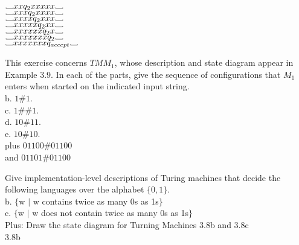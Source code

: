 \documentclass[12pt]{article}
\newcommand\Vtextvisiblespace[1][.8em]{%
	\mbox{\kern.07em\vrule height.3ex}%
	\vbox{\hrule width#1}%
	\hbox{\vrule height.3ex}}
\begin{document}
$\Vtextvisiblespace xx        q_2 xxxxx   \Vtextvisiblespace  $  \\
$\Vtextvisiblespace xxx       q_2 xxxx    \Vtextvisiblespace  $  \\
$\Vtextvisiblespace xxxx      q_2 xxx     \Vtextvisiblespace  $  \\
$\Vtextvisiblespace xxxxx     q_2 xx      \Vtextvisiblespace  $  \\
$\Vtextvisiblespace xxxxxx    q_2 x       \Vtextvisiblespace  $  \\
$\Vtextvisiblespace xxxxxxx   q_2         \Vtextvisiblespace  $  \\
$\Vtextvisiblespace xxxxxxx   q_{accept}  \Vtextvisiblespace  $  \\

\pagebreak

This exercise concerns $TM M_1$, whose description and state diagram appear in 
Example 3.9. In each of the parts, give the sequence of configurations that $M_1$ 
enters when started on the indicated input string. \\

b. $1\#1.$ \\



c. $1\#\#1.$ \\

d. $10\#11.$ \\

e. $10\#10.$ \\

plus $01100\#01100$ \\

and $01101\#01100$ \\

\pagebreak

Give implementation-level descriptions of Turing machines that decide the following
languages over the alphabet $\{0,1\}$. \\

b. $\{$w $\mid$ w contains twice as many 0s as 1s$\}$ \\

c. $\{$w $\mid$ w does not contain twice as many 0s as 1s$\}$ \\

Plus: Draw the state diagram for Turning Machines 3.8b and 3.8c \\
3.8b \\
\end{document}
